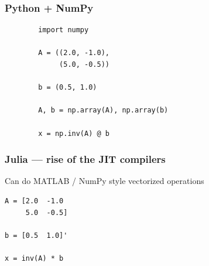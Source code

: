 \documentclass[
    xcolor={svgnames,dvipsnames},
    hyperref={colorlinks, citecolor=DeepPink4, linkcolor=DarkRed, urlcolor=DarkBlue}
    ]{beamer}  %
\newcommand{\1}{\mathbbm 1}
\begin{document}
\begin{frame}[fragile]
    \frametitle{Python + NumPy}


    \begin{verbatim}
        import numpy 

        A = ((2.0, -1.0),
             (5.0, -0.5))

        b = (0.5, 1.0)

        A, b = np.array(A), np.array(b)

        x = np.inv(A) @ b
    \end{verbatim}

\end{frame}

\begin{frame}

    \begin{figure}
       \begin{center} %
       \end{center}
    \end{figure}


\end{frame}


\begin{frame}[fragile]
    \frametitle{Julia --- rise of the JIT compilers}

    Can do MATLAB / NumPy style vectorized operations

    \begin{verbatim}
A = [2.0  -1.0
     5.0  -0.5]

b = [0.5  1.0]'

x = inv(A) * b
    \end{verbatim}
    
\end{frame}
\end{document}
